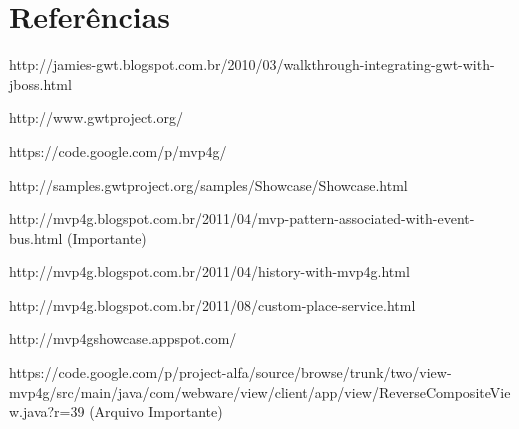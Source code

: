 \section{Referências}

http://jamies-gwt.blogspot.com.br/2010/03/walkthrough-integrating-gwt-with-jboss.html

http://www.gwtproject.org/

https://code.google.com/p/mvp4g/

http://samples.gwtproject.org/samples/Showcase/Showcase.html

http://mvp4g.blogspot.com.br/2011/04/mvp-pattern-associated-with-event-bus.html (Importante)

http://mvp4g.blogspot.com.br/2011/04/history-with-mvp4g.html

http://mvp4g.blogspot.com.br/2011/08/custom-place-service.html

http://mvp4gshowcase.appspot.com/

https://code.google.com/p/project-alfa/source/browse/trunk/two/view-mvp4g/src/main/java/com/webware/view/client/app/view/ReverseCompositeView.java?r=39
(Arquivo Importante)


